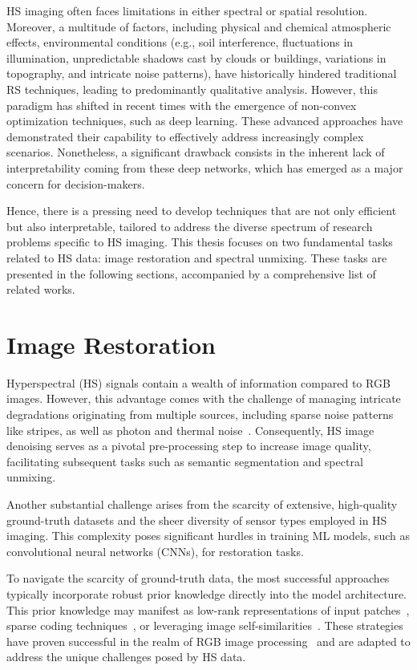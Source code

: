 HS imaging often faces limitations in either spectral or spatial resolution.
Moreover, a multitude of factors, including physical and chemical atmospheric effects, environmental conditions (e.g., soil interference, fluctuations in illumination, unpredictable shadows cast by clouds or buildings, variations in topography, and intricate noise patterns), have historically hindered traditional RS techniques, leading to predominantly qualitative analysis.
However, this paradigm has shifted in recent times with the emergence of non-convex optimization techniques, such as deep learning.
These advanced approaches have demonstrated their capability to effectively address increasingly complex scenarios.
Nonetheless, a significant drawback consists in the inherent lack of interpretability coming from these deep networks, which has emerged as a major concern for decision-makers.

Hence, there is a pressing need to develop techniques that are not only efficient but also interpretable, tailored to address the diverse spectrum of research problems specific to HS imaging.
This thesis focuses on two fundamental tasks related to HS data: image restoration and spectral unmixing.
These tasks are presented in the following sections, accompanied by a comprehensive list of related works.


\section{Image Restoration}
\label{sec:denoising}

Hyperspectral (HS) signals contain a wealth of information compared to RGB images.
However, this advantage comes with the challenge of managing intricate degradations originating from multiple sources, including sparse noise patterns like stripes, as well as photon and thermal noise~\cite{kerekes_hyperspectral_2003, rasti_noise_2018}.
Consequently, HS image denoising serves as a pivotal pre-processing step to increase image quality, facilitating subsequent tasks such as semantic segmentation and spectral unmixing.

Another substantial challenge arises from the scarcity of extensive, high-quality ground-truth datasets and the sheer diversity of sensor types employed in HS imaging.
This complexity poses significant hurdles in training ML models, such as convolutional neural networks (CNNs), for restoration tasks.

To navigate the scarcity of ground-truth data, the most successful approaches typically incorporate robust prior knowledge directly into the model architecture.
This prior knowledge may manifest as low-rank representations of input patches~\cite{fan_spatialspectral_2018, gong_low-rank_2020, rasti_automatic_2017, wang_hyperspectral_2021, zhao_hyperspectral_2015}, sparse coding techniques~\cite{dabov_image_2007, fu_adaptive_2015, gong_low-rank_2020}, or leveraging image self-similarities~\cite{maggioni_nonlocal_2013, peng_decomposable_2014, zhuang_hyperspectral_2017}.
These strategies have proven successful in the realm of RGB image processing~\cite{buades_non-local_2005} and are adapted to address the unique challenges posed by HS data.


